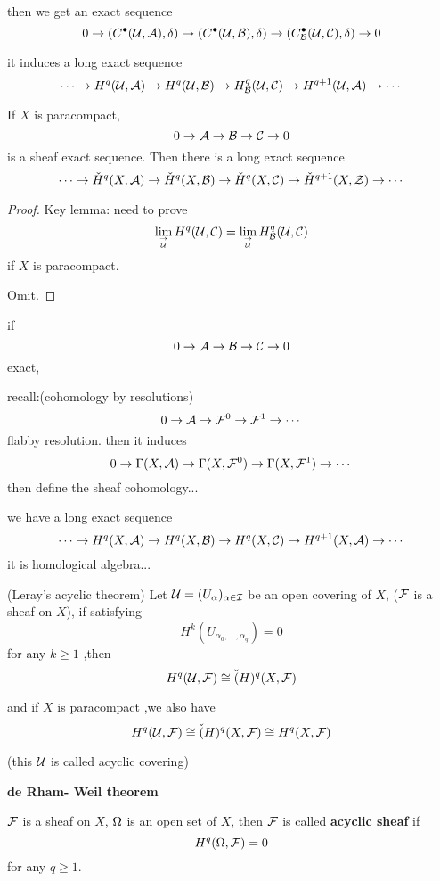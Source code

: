 then we get an exact sequence
$$0\to (C^{\bullet}(\mathcal{U},\mathcal{A}),\delta)\to
(C^{\bullet}(\mathcal{U},\mathcal{B}),\delta)\to
(C^{\bullet}_{\mathcal{B}}(\mathcal{U},\mathcal{C}),\delta)\to 0$$

it induces a long exact sequence
$$\cdots\to
H^q(\mathcal{U},\mathcal{A})\to
H^q(\mathcal{U},\mathcal{B})\to
H^q_{\mathcal{B}}(\mathcal{U},\mathcal{C})\to
H^{q+1}(\mathcal{U},\mathcal{A})\to\cdots
$$

\begin{thm}
If $X$ is paracompact,
$$0\to\mathcal{A}\to\mathcal{B}\to\mathcal{C}\to 0$$
is a sheaf exact sequence.
Then there is a long exact sequence
$$
\cdots\to
\check{H}^q(X,\mathcal{A})\to
\check{H}^q(X,\mathcal{B})\to
\check{H}^q(X,\mathcal{C})\to
\check{H}^{q+1}(X,\mathcal{Z})\to \cdots
$$
\end{thm}
\begin{proof}

Key lemma: need to prove
$$\lim_{\to\atop\mathcal{U}}H^q(\mathcal{U},\mathcal{C})=
\lim_{\to\atop\mathcal{U}}H^q_{\mathcal{B}}(\mathcal{U},\mathcal{C})
$$
if $X$ is paracompact.

Omit.
\end{proof}


if
$$0\to \mathcal{A}\to\mathcal{B}\to\mathcal{C}\to 0$$
exact,

recall:(cohomology by resolutions)
$$
0\to\mathcal{A}\to\mathcal{F}^0\to\mathcal{F}^1\to\cdots
$$
flabby resolution. then it induces
$$0\to\Gamma(X,\mathcal{A})\to\Gamma(X,\mathcal{F}^0)\to\Gamma(X,\mathcal{F}^1)\to\cdots$$
then define the sheaf cohomology...

we have a long exact sequence
$$
\cdots\to H^q(X,\mathcal{A})\to H^q(X,\mathcal{B})\to H^q(X,\mathcal{C})\to H^{q+1}(X,\mathcal{A})\to\cdots
$$
it is homological algebra...

\begin{thm}(Leray's acyclic theorem)
Let $\mathcal{U}=(U_{\alpha})_{\alpha\in\mathcal{I}}$ be an open covering of $X$,
($\mathcal{F}$ is a sheaf on $X$), if satisfying
$$H^k(U_{\alpha_0,...,\alpha_q})=0$$
for any $k \geq 1$ ,then
$$H^q(\mathcal{U},\mathcal{F})\cong \check(H)^q(X,\mathcal{F})$$

and if $X$ is paracompact ,we also have
$$H^q(\mathcal{U},\mathcal{F})\cong \check(H)^q(X,\mathcal{F})\cong H^q(X,\mathcal{F})$$

\end{thm}
(this $\mathcal{U}$ is called acyclic covering)

\textbf{de Rham- Weil theorem}
\begin{definition}
$\mathcal{F}$ is a sheaf on $X$, $\Omega$ is an open set of $X$,
then $\mathcal{F}$ is called \textbf{acyclic sheaf} if
$$H^q(\Omega,\mathcal{F})=0$$
for any $q\geq 1$.
\end{definition}


